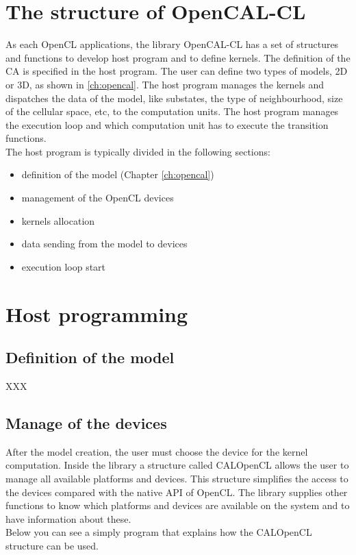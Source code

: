 \section{The structure of OpenCAL-CL}
As each OpenCL applications, the library OpenCAL-CL has a set of structures and
functions to develop host program and to define kernels. The definition of the
CA is specified in the host program. The user can define two types of models, 2D or
3D, as shown in \ref{ch:opencal}. 
The host program manages the kernels and dispatches the data of the model, like substates, the type of neighbourhood, 
size of the cellular space, etc, to the computation units.
The host program
manages the execution loop and which computation unit has to execute the
transition functions. \\
The host program is typically divided in the following sections:
\begin{itemize}
\item definition of the model (Chapter \ref{ch:opencal}) 
\item management of the OpenCL devices
\item kernels allocation
\item data sending from the model to devices
\item execution loop start
\end{itemize}

\section{Host programming} 

\subsection{Definition of the model}

XXX

\subsection{Manage of the devices}

After the model creation, the user must choose the device for the kernel computation.
Inside the library a structure called CALOpenCL allows the user to manage all 
available platforms and devices.
This structure simplifies the access to the devices compared with the native API
of OpenCL. The library supplies other functions to know which platforms and
devices are available on the system and to have information about these.\\
Below you can see a simply program that explains how the 
CALOpenCL structure can be used.


